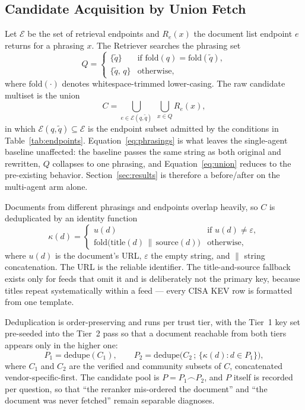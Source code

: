 \documentclass[acmsmall,review,anonymous,screen]{acmart}
\begin{document}
\subsection{Candidate Acquisition by Union Fetch}\label{sec:union-fetch}

Let $\mathcal{E}$ be the set of retrieval endpoints and $R_e(x)$ the
document list endpoint $e$ returns for a phrasing $x$. The Retriever
searches the phrasing set
\begin{equation}
Q =
\begin{cases}
\{\tilde{q}\} & \text{if } \mathrm{fold}(q) = \mathrm{fold}(\tilde{q}),\\
\{\tilde{q},\, q\} & \text{otherwise,}
\end{cases}
\label{eq:phrasings}
\end{equation}
where $\mathrm{fold}(\cdot)$ denotes whitespace-trimmed
lower-casing. The raw candidate multiset is the union
\begin{equation}
C = \bigcup_{e \in \mathcal{E}(q,\tilde{q})} \; \bigcup_{x \in Q} R_e(x),
\label{eq:union}
\end{equation}
in which $\mathcal{E}(q,\tilde{q}) \subseteq \mathcal{E}$ is the
endpoint subset admitted by the conditions in
Table~\ref{tab:endpoints}. Equation~\eqref{eq:phrasings} is what leaves
the single-agent baseline unaffected: the baseline passes the same
string as both original and rewritten, $Q$ collapses to one phrasing,
and Equation~\eqref{eq:union} reduces to the pre-existing
behavior. Section~\ref{sec:results} is therefore a before/after on the
multi-agent arm alone.

Documents from different phrasings and endpoints overlap heavily, so
$C$ is deduplicated by an identity function
\begin{equation}
\kappa(d) =
\begin{cases}
u(d) & \text{if } u(d) \neq \varepsilon,\\
\mathrm{fold}\big(\mathrm{title}(d) \,\|\, \mathrm{source}(d)\big) & \text{otherwise,}
\end{cases}
\label{eq:key}
\end{equation}
where $u(d)$ is the document's URL, $\varepsilon$ the empty string, and
$\|$ string concatenation. The URL is the reliable identifier. The
title-and-source fallback exists only for feeds that omit it and is
deliberately not the primary key, because titles repeat systematically
within a feed --- every CISA KEV row is formatted from one template.

Deduplication is order-preserving and runs per trust tier, with the
Tier~1 key set pre-seeded into the Tier~2 pass so that a document
reachable from both tiers appears only in the higher one:
\begin{equation}
P_1 = \mathrm{dedupe}(C_1), \qquad
P_2 = \mathrm{dedupe}\big(C_2 \,;\, \{\kappa(d) : d \in P_1\}\big),
\label{eq:tiers}
\end{equation}
where $C_1$ and $C_2$ are the verified and community subsets of $C$,
concatenated vendor-specific-first. The candidate pool is
$P = P_1 \frown P_2$, and $P$ itself is recorded per question, so that
``the reranker mis-ordered the document'' and ``the document was never
fetched'' remain separable diagnoses.
\end{document}
